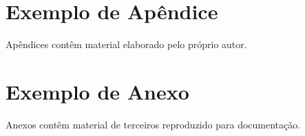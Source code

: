 \documentclass[ppgc,diss,english]{infufrgs}
\begin{document}
\appendix

\chapter{Exemplo de Apêndice}

Apêndices contêm material elaborado pelo próprio autor.

\annex

\chapter{Exemplo de Anexo}

Anexos contêm material de terceiros reproduzido para documentação.



\end{document}
